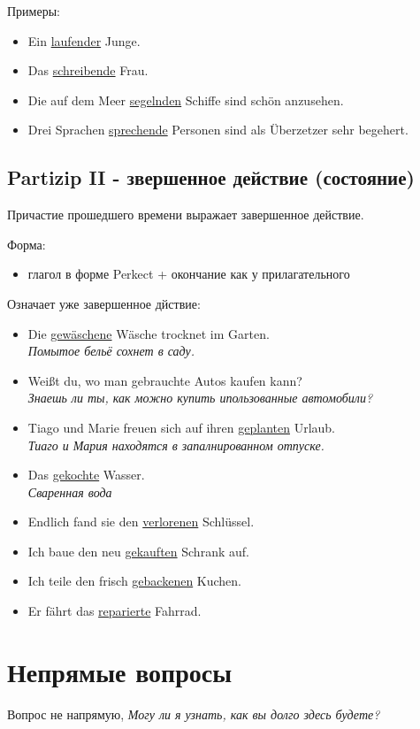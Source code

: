 \documentclass[12pt,a4paper]{report}
\newcommand{\satzew}[1]{\underline{#1}}
\newcommand{\ubersatze}[1]{\textit{#1}}
\begin{document}
Примеры:
\begin{itemize}
\item Ein \satzew{laufender} Junge.
\item Das \satzew{schreibende} Frau.
\item Die auf dem Meer \satzew{segelnden} Schiffe sind schön anzusehen.
\item Drei Sprachen \satzew{sprechende} Personen sind als Überzetzer sehr begehert.
\end{itemize}

\section{Partizip II - звершенное действие (состояние)}

Причастие прошедшего времени выражает завершенное действие.

Форма:
\begin{itemize}
\item глагол в форме Perkect + окончание как у прилагательного
\end{itemize}

Означает уже завершенное дйствие:
\begin{itemize}
\item Die \satzew{gewäschene} Wäsche trocknet im Garten.
~\\ \ubersatze{Помытое бельё сохнет в саду.}
\item Weißt du, wo man gebrauchte Autos kaufen kann?
~\\ \ubersatze{Знаешь ли ты, как можно купить ипользованные автомобили?}
\item Tiago und Marie freuen sich auf ihren \satzew{geplanten} Urlaub.
~\\ \ubersatze{Тиаго и Мария находятся в запалнированном отпуске.}
\item Das \satzew{gekochte} Wasser.
~\\ \ubersatze{Сваренная вода}
\item Endlich fand sie den \satzew{verlorenen} Schlüssel.
\item Ich baue den neu \satzew{gekauften} Schrank auf.
\item Ich teile den frisch \satzew{gebackenen} Kuchen.
\item Er fährt das \satzew{reparierte} Fahrrad.
\end{itemize}

\chapter{Непрямые вопросы}
Вопрос не напрямую, \ubersatze{Могу ли я узнать, как вы долго здесь будете?}
\end{document}

